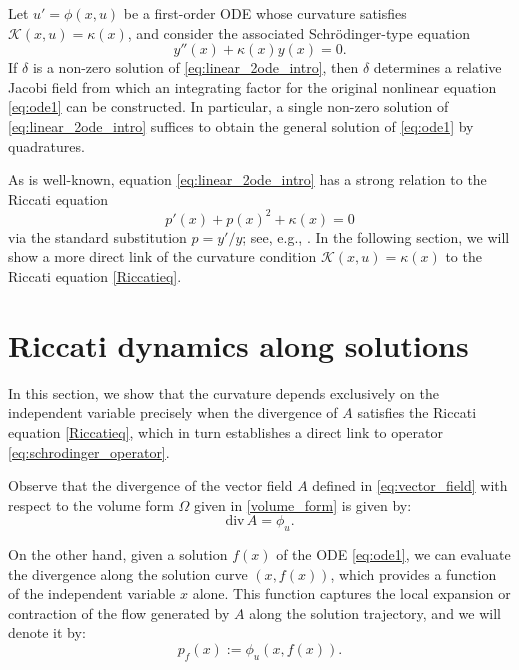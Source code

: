 \documentclass[preprint,a4paper]{elsarticle}
\begin{document}
\begin{theorem}\label{thm:jacobi_integration}
Let $u' = \phi(x,u)$ be a first-order ODE whose curvature satisfies $\mathcal{K}(x,u) = \kappa(x)$, and consider the associated Schrödinger-type equation
\begin{equation} \label{eq:linear_2ode_intro}
    y''(x) + \kappa(x)y(x) = 0.
\end{equation}
If $\delta$ is a non-zero solution of \eqref{eq:linear_2ode_intro}, then $\delta$ determines a relative Jacobi field from which an integrating factor for the original nonlinear equation \eqref{eq:ode1} can be constructed. In particular, a single non-zero solution of \eqref{eq:linear_2ode_intro} suffices to obtain the general solution of \eqref{eq:ode1} by quadratures.
\end{theorem}

As is well-known, equation \eqref{eq:linear_2ode_intro} has a strong relation to the Riccati equation 
\begin{equation}\label{Riccatieq}
p'(x) + p(x)^2 + \kappa(x) = 0
\end{equation}
via the standard substitution $p = y'/y$; see, e.g., \cite{Teschl2012}. In the following section, we will show a more direct link of the curvature condition $\mathcal{K}(x,u) = \kappa(x)$ to the Riccati equation \eqref{Riccatieq}.






\section{Riccati dynamics along solutions}\label{section:riccati}

In this section, we show that the curvature depends exclusively on the independent variable precisely when the divergence of $A$ satisfies the Riccati equation \eqref{Riccatieq}, which in turn establishes a direct link to operator \eqref{eq:schrodinger_operator}.


Observe that the divergence of the vector field $A$ defined in \eqref{eq:vector_field} with respect to the volume form $\Omega$ given in \eqref{volume_form}
is given by:
\begin{equation} \label{eq:divergence}
    \text{div}\,A =  \phi_u. %
\end{equation}

On the other hand, given a solution $f(x)$ of the ODE \eqref{eq:ode1}, we can evaluate the divergence along the solution curve $(x,f(x))$, which provides a function of the independent variable $x$ alone. This function captures the local expansion or contraction of the flow generated by $A$ along the solution trajectory, and we will denote it by:
\begin{equation} \label{eq:p_definition}
    p_f(x) := \phi_u(x, f(x)).
\end{equation}
\end{document}
